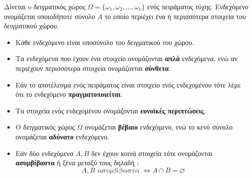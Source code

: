 Δίνεται o δειγματικός χώρος $ \varOmega=\{\omega_1,\omega_2,\ldots,\omega_{\nu}\} $ ενός πειράματος τύχης. Ενδεχόμενο ονομάζεται οποιοδήποτε σύνολο $A$ το οποίο περιέχει ένα ή περισσότερα στοιχεία του δειγματικού χώρου.
\begin{itemize}[itemsep=0mm]
\item Κάθε ενδεχόμενο είναι υποσύνολο του δειγματικού του χώρου.
\item Τα ενδεχόμενα που έχουν ένα στοιχείο ονομάζονται \textbf{απλά} ενδεχόμενα, ενώ αν περιέχουν περισσότερα στοιχεία ονομάζονται \textbf{σύνθετα}.
\item Εάν το αποτέλεσμα ενός πειράματος είναι στοιχείο ενός ενδεχομένου τότε λέμε ότι το ενδεχόμενο \textbf{πραγματοποιείται}.
\item Τα στοιχεία ενός ενδεχομένου ονομάζονται \textbf{ευνοϊκές περιπτώσεις}.
\item Ο δειγματικός χώρος $ \varOmega $ ονομάζεται \textbf{βέβαιο} ενδεχόμενο, ενώ το κενό σύνολο ονομάζεται \textbf{αδύνατο} ενδεχόμενο.
\item Εάν δύο ενδεχόμενα $ A,B $ δεν έχουν κοινά στοιχεία τότε ονομάζονται \textbf{ασυμβίβαστα} ή ξένα μεταξύ τους δηλαδή : \[ A,B \textrm{ ασυμβίβαστα }\Leftrightarrow A\cap B=\varnothing \]
\end{itemize}
